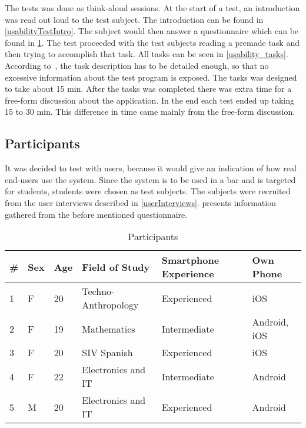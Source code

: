 The tests was done as think-aloud sessions. At the start of a test, an introduction was read out loud to the test
subject. The introduction can be found in
\cref{usabilityTestIntro}. The subject would then answer a
questionnaire which can be found in \cref{tab:participants}. The test
proceeded with the test subjects reading a premade task and then
trying to accomplish that task. All tasks can be seen in \cref{usability_tasks}. According to~\cite{RubinChisnellSpool08}, the task description has to be detailed enough, so that no excessive information about the test program is exposed. The tasks was designed to take about 15 min. After the tasks was completed there was extra time for a free-form discussion about the application. In the end each test ended up taking 15 to 30 min. This difference in time came mainly from the free-form discussion.

\subsection{Participants}
It was decided to test with users, because it would give an indication
of how real end-users use the system. Since the system is to be used
in a bar and is targeted for students, students were chosen as test
subjects. The subjects were recruited from the user interviews
described in \cref{userInterviews}.  presents
information gathered from the before mentioned questionnaire.

\begin{table}[h]
\begin{tabular}{|l|l|l|l|l|l|}
\hline
\textbf{\#} & \textbf{Sex} & \textbf{Age} & \textbf{Field of Study} & \textbf{Smartphone Experience} & \textbf{Own Phone} \\ \hline
1                   & F               & 20           & Techno-Anthropology       & Experienced                  & iOS                    \\ \hline
2                   & F               & 19           & Mathematics             & Intermediate                   & Android, iOS           \\ \hline
3                   & F               & 20           & SIV Spanish             & Experienced                    & iOS                    \\ \hline
4                   & F               & 22           & Electronics and IT      & Intermediate                   & Android                \\ \hline
5                   & M               & 20           & Electronics and IT      & Experienced                    & Android                \\ \hline
\end{tabular}
\caption{Participants}\label{tab:participants}
\end{table}

